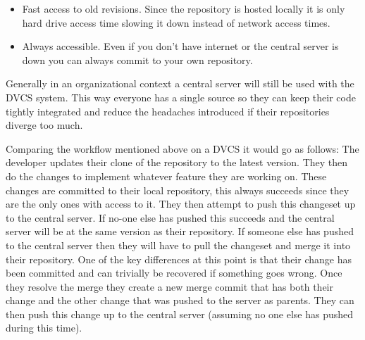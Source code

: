     \begin{itemize}
      \item Fast access to old revisions.  Since the repository is hosted
      locally it is only hard drive access time slowing it down instead of
      network access times.
      \item Always accessible.  Even if you don't have internet or the central
      server is down you can always commit to your own repository.
    \end{itemize}

    Generally in an organizational context a central server will still be used
    with the DVCS system.  This way everyone has a single source so they can
    keep their code tightly integrated and reduce the headaches introduced if
    their repositories diverge too much.

    Comparing the workflow mentioned above on a DVCS it would go as follows: The
    developer updates their clone of the repository to the latest version.  They
    then do the changes to implement whatever feature they are working on.
    These changes are committed to their local repository, this always succeeds
    since they are the only ones with access to it.  They then attempt to push
    this changeset up to the central server.  If no-one else has pushed this
    succeeds and the central server will be at the same version as their
    repository.  If someone else has pushed to the central server then they will
    have to pull the changeset and merge it into their repository.  One of the
    key differences at this point is that their change has been committed and
    can trivially be recovered if something goes wrong.  Once they resolve the
    merge they create a new merge commit that has both their change and the
    other change that was pushed to the server as parents.  They can then push
    this change up to the central server (assuming no one else has pushed during
    this time).
